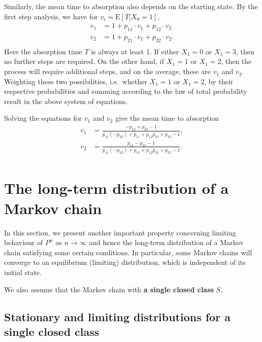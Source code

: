 \documentclass[
]{book}
\theoremstyle{definition}
\theoremstyle{definition}
\theoremstyle{definition}
\theoremstyle{definition}
\theoremstyle{remark}
\begin{document}
Similarly, the mean time to absorption also depends on the starting
state. By the first step analysis, we have for
\(v_i = \mathrm{E}[T | X_0 = 1 ]\), \[\begin{aligned}
    v_1 &=  1 + p_{11} \cdot v_1 + p_{12} \cdot v_2 \\
    v_2 &=  1 + p_{21} \cdot v_1 + p_{22} \cdot v_2. \\\end{aligned}\]
Here the absorption time \(T\) is always at least 1. If either \(X_1 = 0\)
or \(X_1 = 3\), then no further steps are required. On the other hand, if
\(X_1 = 1\) or \(X_1 = 2\), then the process will require additional steps,
and on the average, these are \(v_1\) and \(v_2\). Weighting these two
possibilities, i.e.~whether \(X_1 = 1\) or \(X_1 = 2\), by their respective
probabilities and summing according to the law of total probability
result in the above system of equations.

Solving the equations for \(v_1\) and \(v_2\) give the mean time to
absorption \[\begin{aligned}
    v_1 &=  \frac{-p_{12}  + p_{22} -1}{p_{11}(-p_{22}) + p_{11} + p_{12}p_{21} + p_{22} - 1}, \\
    v_2 &=  \frac{p_{11}  - p_{21} -1}{p_{11}(-p_{22}) + p_{11} + p_{12}p_{21} + p_{22} - 1}. \\\end{aligned}\]

\hypertarget{the-long-term-distribution-of-a-markov-chain}{%
\chapter{The long-term distribution of a Markov chain}\label{the-long-term-distribution-of-a-markov-chain}}

In this section, we present another important property concerning
limiting behaviour of \(P^n\) as \(n \rightarrow \infty\) and hence the
long-term distribution of a Markov chain satisfying some certain
conditions. In particular, some Markov chains will converge to an
equilibrium (limiting) distribution, which is independent of its initial
state.

We also assume that the Markov chain with \textbf{a single closed class} \(S\).

\hypertarget{stationary-and-limiting-distributions-for-a-single-closed-class}{%
\section{Stationary and limiting distributions for a single closed class}\label{stationary-and-limiting-distributions-for-a-single-closed-class}}
\end{document}
